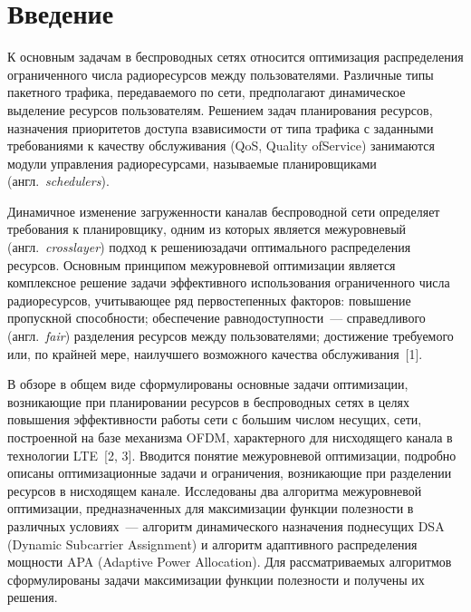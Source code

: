       \begin{multicols}{2}

            \label{st\stat}
   
\section{Введение}
  
  К основным задачам в беспроводных сетях относится оптимизация распределения 
ограниченного числа радиоресурсов между пользователями. Различные типы пакетного 
трафика, передаваемого по сети, предполагают динамическое выделение ресурсов 
пользователям. Решением задач планирования ресурсов, назначения приоритетов доступа 
в\linebreak зависимости от типа трафика с заданными требованиями к качеству обслуживания (QoS, 
Quality of\linebreak Service) занимаются модули управления радиоресурсами, называемые 
планировщиками (англ.\ \textit{schedulers}).
  
  Динамичное изменение загруженности канала\linebreak в беспроводной сети определяет 
требования к планиров\-щику, одним из которых является меж\-уров\-не\-вый (англ.\ 
\textit{crosslayer}) подход к решению\linebreak задачи оптимального распределения ресурсов. 
Основным принципом межуровневой оптимизации является комплексное решение задачи 
эффективного использования ограниченного числа радиоресурсов, учитывающее ряд 
первостепенных факторов: повышение пропускной способности; обеспечение 
равнодоступности~--- справедливого (англ.~\textit{fair}) разделения ресурсов между 
пользователями; достижение требуемого или, по крайней мере, наилучшего возможного 
качества обслуживания~[1].
  
  В обзоре в общем виде сформулированы основные задачи оптимизации, возникающие 
при планировании ресурсов в беспроводных сетях в целях повышения эффективности 
работы сети с большим числом несущих, сети, построенной на базе механизма OFDM, 
характерного для нисходящего канала в технологии LTE~[2, 3]. Вводится понятие 
межуровневой оптимизации, подробно описаны оптимизационные задачи и ограничения, 
возникающие при разделении ресурсов в нисходящем канале. Исследованы два алгоритма 
межуровневой оптимизации, предназначенных для максимизации функции полезности в 
различных условиях~--- алгоритм динамического назначения поднесущих DSA (Dynamic 
Subcarrier Assignment) и алгоритм адап\-тив\-но\-го распределения мощности APA (Adaptive 
Power Allocation). Для рассматриваемых алгоритмов сформулированы задачи 
максимизации функции полезности и получены их решения.


\end{multicols}
